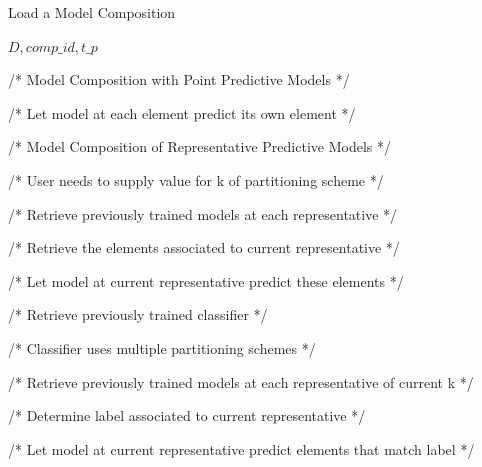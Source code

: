 \begin{algorithm}[h!]
\caption{Load a Model Composition}\label{alg:modelcomp}
\begin{algorithmic}[1] 
 {$D, comp\_id, t\_p$}


/* Model Composition with Point Predictive Models */

    
    /* Let model at each element predict its own element */
    
\EndIf

/* Model Composition of Representative Predictive Models */

    /* User needs to supply value for k of partitioning scheme */
    
    /* Retrieve previously trained models at each representative */
    
    
        /* Retrieve the elements associated to current representative */
        
        /* Let model at current representative predict these elements */
    \EndFor

\EndIf


    /* Retrieve previously trained classifier */
    
    /* Classifier uses multiple partitioning schemes */
    
        /* Retrieve previously trained models at each representative of current k */

        
            /* Determine label associated to current representative */
            
            /* Let model at current representative predict elements that match label */
        \EndFor

    \EndFor
\EndIf

\EndFunction 
\end{algorithmic} 
\end{algorithm}

